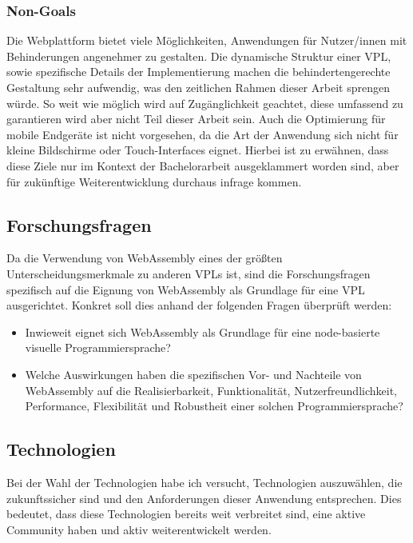 \documentclass[ngerman]{article}
\begin{document}
\subsubsection{Non-Goals}
Die Webplattform bietet viele Möglichkeiten, Anwendungen für Nutzer/innen mit Behinderungen angenehmer zu gestalten. Die dynamische Struktur einer VPL, sowie spezifische Details der Implementierung machen die behindertengerechte Gestaltung sehr aufwendig, was den zeitlichen Rahmen dieser Arbeit sprengen würde. So weit wie möglich wird auf Zugänglichkeit geachtet, diese umfassend zu garantieren wird aber nicht Teil dieser Arbeit sein.
\br
Auch die Optimierung für mobile Endgeräte ist nicht vorgesehen, da die Art der Anwendung sich nicht für kleine Bildschirme oder Touch-Interfaces eignet.
\br
Hierbei ist zu erwähnen, dass diese Ziele nur im Kontext der Bachelorarbeit ausgeklammert worden sind, aber für zukünftige Weiterentwicklung durchaus infrage kommen.

\subsection{Forschungsfragen}
Da die Verwendung von WebAssembly eines der größten Unterscheidungsmerkmale zu anderen VPLs ist, sind die Forschungsfragen spezifisch auf die Eignung von WebAssembly als Grundlage für eine VPL ausgerichtet. Konkret soll dies anhand der folgenden Fragen überprüft werden:
\begin{itemize}
  \item Inwieweit eignet sich WebAssembly als Grundlage für eine node-basierte visuelle Programmiersprache?  
  \item Welche Auswirkungen haben die spezifischen Vor- und Nachteile von WebAssembly auf die Realisierbarkeit, Funktionalität, Nutzerfreundlichkeit, Performance, Flexibilität und Robustheit einer solchen Programmiersprache?
\end{itemize}

\pagebreak

\subsection{Technologien}

Bei der Wahl der Technologien habe ich versucht, Technologien auszuwählen, die zukunftssicher sind und den Anforderungen dieser Anwendung entsprechen. Dies bedeutet, dass diese Technologien bereits weit verbreitet sind, eine aktive Community haben und aktiv weiterentwickelt werden.
\end{document}
